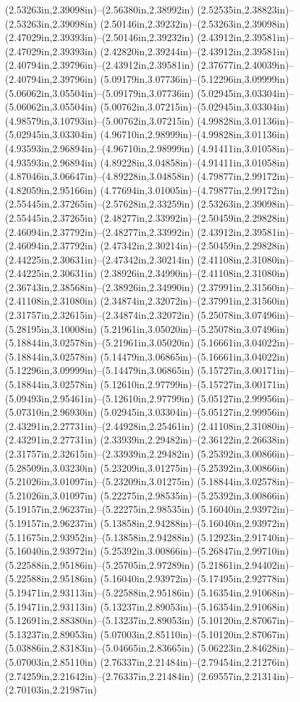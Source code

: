 (2.53263in,2.39098in)--(2.56380in,2.38992in) (2.52535in,2.38823in)--(2.53263in,2.39098in) (2.50146in,2.39232in)--(2.53263in,2.39098in) (2.47029in,2.39393in)--(2.50146in,2.39232in) (2.43912in,2.39581in)--(2.47029in,2.39393in) (2.42820in,2.39244in)--(2.43912in,2.39581in) (2.40794in,2.39796in)--(2.43912in,2.39581in) (2.37677in,2.40039in)--(2.40794in,2.39796in) (5.09179in,3.07736in)--(5.12296in,3.09999in) (5.06062in,3.05504in)--(5.09179in,3.07736in) (5.02945in,3.03304in)--(5.06062in,3.05504in) (5.00762in,3.07215in)--(5.02945in,3.03304in) (4.98579in,3.10793in)--(5.00762in,3.07215in) (4.99828in,3.01136in)--(5.02945in,3.03304in) (4.96710in,2.98999in)--(4.99828in,3.01136in) (4.93593in,2.96894in)--(4.96710in,2.98999in) (4.91411in,3.01058in)--(4.93593in,2.96894in) (4.89228in,3.04858in)--(4.91411in,3.01058in) (4.87046in,3.06647in)--(4.89228in,3.04858in) (4.79877in,2.99172in)--(4.82059in,2.95166in) (4.77694in,3.01005in)--(4.79877in,2.99172in) (2.55445in,2.37265in)--(2.57628in,2.33259in) (2.53263in,2.39098in)--(2.55445in,2.37265in) (2.48277in,2.33992in)--(2.50459in,2.29828in) (2.46094in,2.37792in)--(2.48277in,2.33992in) (2.43912in,2.39581in)--(2.46094in,2.37792in) (2.47342in,2.30214in)--(2.50459in,2.29828in) (2.44225in,2.30631in)--(2.47342in,2.30214in) (2.41108in,2.31080in)--(2.44225in,2.30631in) (2.38926in,2.34990in)--(2.41108in,2.31080in) (2.36743in,2.38568in)--(2.38926in,2.34990in) (2.37991in,2.31560in)--(2.41108in,2.31080in) (2.34874in,2.32072in)--(2.37991in,2.31560in) (2.31757in,2.32615in)--(2.34874in,2.32072in) (5.25078in,3.07496in)--(5.28195in,3.10008in) (5.21961in,3.05020in)--(5.25078in,3.07496in) (5.18844in,3.02578in)--(5.21961in,3.05020in) (5.16661in,3.04022in)--(5.18844in,3.02578in) (5.14479in,3.06865in)--(5.16661in,3.04022in) (5.12296in,3.09999in)--(5.14479in,3.06865in) (5.15727in,3.00171in)--(5.18844in,3.02578in) (5.12610in,2.97799in)--(5.15727in,3.00171in) (5.09493in,2.95461in)--(5.12610in,2.97799in) (5.05127in,2.99956in)--(5.07310in,2.96930in) (5.02945in,3.03304in)--(5.05127in,2.99956in) (2.43291in,2.27731in)--(2.44928in,2.25461in) (2.41108in,2.31080in)--(2.43291in,2.27731in) (2.33939in,2.29482in)--(2.36122in,2.26638in) (2.31757in,2.32615in)--(2.33939in,2.29482in) (5.25392in,3.00866in)--(5.28509in,3.03230in) (5.23209in,3.01275in)--(5.25392in,3.00866in) (5.21026in,3.01097in)--(5.23209in,3.01275in) (5.18844in,3.02578in)--(5.21026in,3.01097in) (5.22275in,2.98535in)--(5.25392in,3.00866in) (5.19157in,2.96237in)--(5.22275in,2.98535in) (5.16040in,2.93972in)--(5.19157in,2.96237in) (5.13858in,2.94288in)--(5.16040in,2.93972in) (5.11675in,2.93952in)--(5.13858in,2.94288in) (5.12923in,2.91740in)--(5.16040in,2.93972in) (5.25392in,3.00866in)--(5.26847in,2.99710in) (5.22588in,2.95186in)--(5.25705in,2.97289in) (5.21861in,2.94402in)--(5.22588in,2.95186in) (5.16040in,2.93972in)--(5.17495in,2.92778in) (5.19471in,2.93113in)--(5.22588in,2.95186in) (5.16354in,2.91068in)--(5.19471in,2.93113in) (5.13237in,2.89053in)--(5.16354in,2.91068in) (5.12691in,2.88380in)--(5.13237in,2.89053in) (5.10120in,2.87067in)--(5.13237in,2.89053in) (5.07003in,2.85110in)--(5.10120in,2.87067in) (5.03886in,2.83183in)--(5.04665in,2.83665in) (5.06223in,2.84628in)--(5.07003in,2.85110in) (2.76337in,2.21484in)--(2.79454in,2.21276in) (2.74259in,2.21642in)--(2.76337in,2.21484in) (2.69557in,2.21314in)--(2.70103in,2.21987in) 